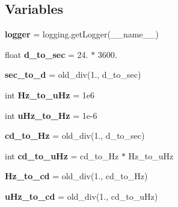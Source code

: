 \subsection*{Variables}
\begin{DoxyCompactItemize}
\item 
\mbox{\label{namespaceasamba_1_1star_ad7dc47d8695f2f6c4233012de347fd8d}} 
{\bfseries logger} = logging.\+get\+Logger(\+\_\+\+\_\+name\+\_\+\+\_\+)
\item 
\mbox{\label{namespaceasamba_1_1star_a71f80b4f0c9f94090c885eb1f17efecb}} 
float {\bfseries d\+\_\+to\+\_\+sec} = 24. $\ast$ 3600.
\item 
\mbox{\label{namespaceasamba_1_1star_abe126cbfe92a9f682a8e5e40540e991c}} 
{\bfseries sec\+\_\+to\+\_\+d} = old\+\_\+div(1., d\+\_\+to\+\_\+sec)
\item 
\mbox{\label{namespaceasamba_1_1star_a11cf44476c37f524099b4defdf75ca03}} 
int {\bfseries Hz\+\_\+to\+\_\+u\+Hz} = 1e6
\item 
\mbox{\label{namespaceasamba_1_1star_a876dccc99a4b4390cf8888deb3934a5d}} 
int {\bfseries u\+Hz\+\_\+to\+\_\+\+Hz} = 1e-\/6
\item 
\mbox{\label{namespaceasamba_1_1star_a8edb72bba5868708a29727b1c5d38111}} 
{\bfseries cd\+\_\+to\+\_\+\+Hz} = old\+\_\+div(1., d\+\_\+to\+\_\+sec)
\item 
\mbox{\label{namespaceasamba_1_1star_a13fc70f6b59c6e47b41cc56802af801d}} 
int {\bfseries cd\+\_\+to\+\_\+u\+Hz} = cd\+\_\+to\+\_\+\+Hz $\ast$ Hz\+\_\+to\+\_\+u\+Hz
\item 
\mbox{\label{namespaceasamba_1_1star_a448122e74e65abb5784374d029546bb2}} 
{\bfseries Hz\+\_\+to\+\_\+cd} = old\+\_\+div(1., cd\+\_\+to\+\_\+\+Hz)
\item 
\mbox{\label{namespaceasamba_1_1star_a27650b27200eb43968a4868a4c4d5f62}} 
{\bfseries u\+Hz\+\_\+to\+\_\+cd} = old\+\_\+div(1., cd\+\_\+to\+\_\+u\+Hz)
\item 

\end{DoxyCompactItemize}
